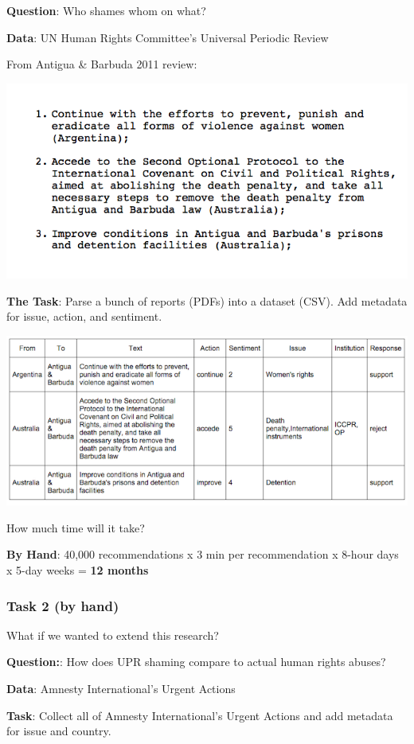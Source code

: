 \documentclass[
]{book}
\begin{document}
\textbf{Question}: Who shames whom on what?

\textbf{Data}: UN Human Rights Committee's Universal Periodic Review

From Antigua \& Barbuda 2011 review:

\begin{center}\includegraphics[width=0.7\linewidth]{img/upr-text} \end{center}

\textbf{The Task}: Parse a bunch of reports (PDFs) into a dataset (CSV). Add metadata for issue, action, and sentiment.

\begin{center}\includegraphics[width=0.7\linewidth]{img/upr-table} \end{center}

How much time will it take?

\textbf{By Hand}: 40,000 recommendations x 3 min per recommendation x 8-hour days x 5-day weeks = \textbf{12 months}

\hypertarget{task-2-by-hand}{%
\subsubsection*{Task 2 (by hand)}\label{task-2-by-hand}}

What if we wanted to extend this research?

\textbf{Question:}: How does UPR shaming compare to actual human rights abuses?

\textbf{Data}: Amnesty International's Urgent Actions

\textbf{Task}: Collect all of Amnesty International's Urgent Actions and add metadata for issue and country.
\end{document}
